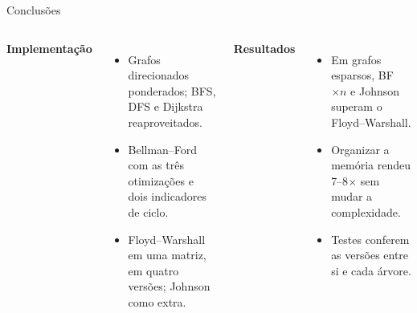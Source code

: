 \documentclass[10pt,aspectratio=169]{beamer}
\begin{document}
\begin{frame}{Conclusões}
\begin{columns}[T,onlytextwidth]
\textbf{Implementação}
\begin{itemize}
\item Grafos direcionados ponderados; BFS, DFS e Dijkstra reaproveitados.
\item Bellman--Ford com as três otimizações e dois indicadores de ciclo.
\item Floyd--Warshall em uma matriz, em quatro versões; Johnson como extra.
\end{itemize}
\textbf{Resultados}
\begin{itemize}
\item Em grafos esparsos, BF \(\times n\) e Johnson superam o Floyd--Warshall.
\item Organizar a memória rendeu 7--8\(\times\) sem mudar a complexidade.
\item Testes conferem as versões entre si e cada árvore.
\end{itemize}
\end{columns}
\end{frame}
\end{document}
